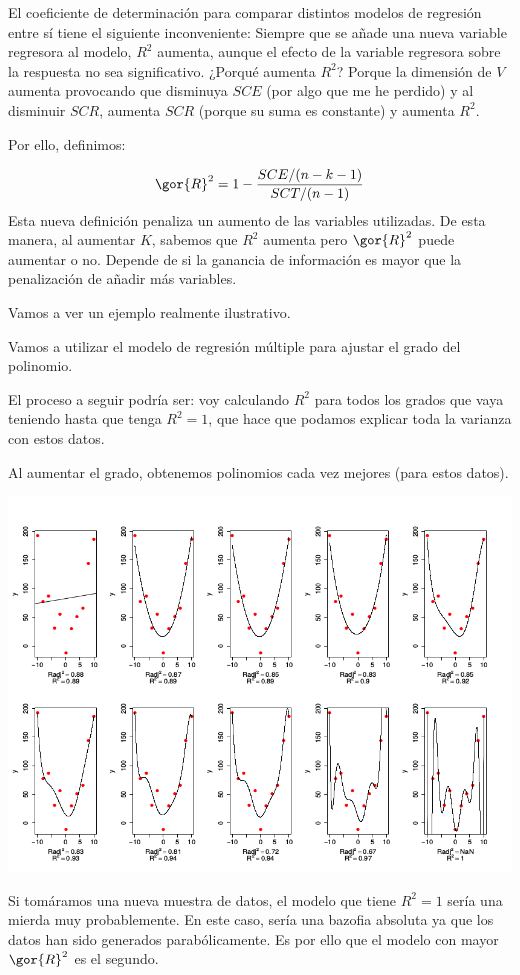 El coeficiente de determinación para comparar distintos modelos de regresión entre sí tiene el siguiente inconveniente:
Siempre que se añade una nueva variable regresora al modelo, $R^2$ aumenta, aunque el efecto de la variable regresora sobre la respuesta no sea significativo. ¿Porqué aumenta $R^2$? Porque la dimensión de $V$ aumenta provocando que disminuya $SCE$ (por algo que me he perdido) y al disminuir $SCR$, aumenta $SCR$ (porque su suma es constante) y aumenta $R^2$.

Por ello, definimos:


\begin{defn}
\[\gor{R}^2 = 1 - \frac{SCE/(n-k-1)}{SCT/(n-1)}\]
Esta nueva definición penaliza un aumento de las variables utilizadas. De esta manera, al aumentar $K$, sabemos que $R^2$ aumenta pero $\gor{R}^2$ puede aumentar o no. Depende de si la ganancia de información es mayor que la penalización de añadir más variables.
\end{defn}

Vamos a ver un ejemplo realmente ilustrativo.
\begin{example}

Vamos a utilizar el modelo de regresión múltiple para ajustar el grado del polinomio.

El proceso a seguir podría ser: voy calculando $R^2$ para todos los grados que vaya teniendo hasta que tenga $R^2 = 1$, que hace que podamos explicar toda la varianza con estos datos. 


Al aumentar el grado, obtenemos polinomios cada vez mejores (para estos datos).

\begin{center}
\includegraphics[scale=0.45]{img/RvsRAdj.png}
\end{center}

Si tomáramos una nueva muestra de datos, el modelo que tiene $R^2=1$ sería una mierda muy probablemente. En este caso, sería una bazofia absoluta ya que los datos han sido generados parabólicamente. Es por ello que el modelo con mayor $\gor{R}^2$ es el segundo.

\end{example}


